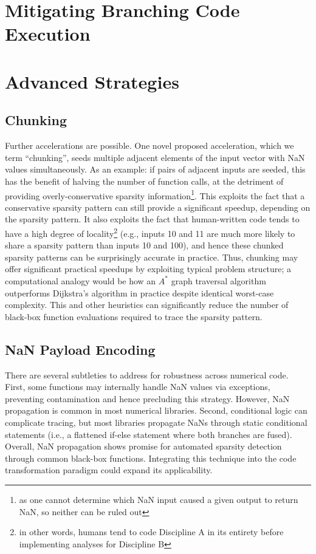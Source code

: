 

\section{Mitigating Branching Code Execution}


\section{Advanced Strategies}

\subsection{Chunking}

Further accelerations are possible. One novel proposed acceleration, which we term ``chunking'', seeds multiple adjacent elements of the input vector with NaN values simultaneously. As an example: if pairs of adjacent inputs are seeded, this has the benefit of halving the number of function calls, at the detriment of providing overly-conservative sparsity information\footnote{as one cannot determine which NaN input caused a given output to return NaN, so neither can be ruled out}. This exploits the fact that a conservative sparsity pattern can still provide a significant speedup, depending on the sparsity pattern. It also exploits the fact that human-written code tends to have a high degree of locality\footnote{in other words, humans tend to code Discipline A in its entirety before implementing analyses for Discipline B} (e.g., inputs 10 and 11 are much more likely to share a sparsity pattern than inputs 10 and 100), and hence these chunked sparsity patterns can be surprisingly accurate in practice. Thus, chunking may offer significant practical speedups by exploiting typical problem structure; a computational analogy would be how an $A^*$ graph traversal algorithm outperforms Dijkstra's algorithm in practice despite identical worst-case complexity. This and other heuristics can significantly reduce the number of black-box function evaluations required to trace the sparsity pattern.

\subsection{NaN Payload Encoding}


There are several subtleties to address for robustness across numerical code. First, some functions may internally handle NaN values via exceptions, preventing contamination and hence precluding this strategy. However, NaN propagation is common in most numerical libraries. Second, conditional logic can complicate tracing, but most libraries propagate NaNs through static conditional statements (i.e., a flattened if-else statement where both branches are fused). Overall, NaN propagation shows promise for automated sparsity detection through common black-box functions. Integrating this technique into the code transformation paradigm could expand its applicability.
